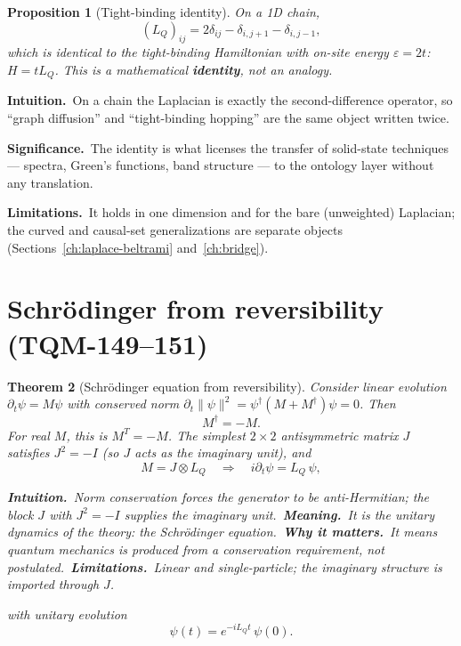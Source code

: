 \documentclass[10pt,twoside,openany]{book}
\newtheorem{theorem}{Theorem}[chapter]
\newtheorem{proposition}[theorem]{Proposition}
\newcommand{\theoremnotes}[3]{%
  \par\medskip\noindent
  \textbf{Intuition.}\ #1\par
  \textbf{Significance.}\ #2\par
  \textbf{Limitations.}\ #3\par}
\newcommand{\eqnotes}[4]{%
  \par\smallskip\noindent
  \textbf{Intuition.}\ #1\ 
  \textbf{Meaning.}\ #2\ 
  \textbf{Why it matters.}\ #3\ 
  \textbf{Limitations.}\ #4\par}
\begin{document}
\begin{proposition}[Tight-binding identity]
On a 1D chain,
\begin{equation}
(L_Q)_{ij} = 2\delta_{ij} - \delta_{i,j+1} - \delta_{i,j-1},
\end{equation}
which is \emph{identical} to the tight-binding Hamiltonian with on-site energy
$\varepsilon=2t$: $H = t L_Q$. This is a mathematical \textbf{identity}, not an analogy.
\end{proposition}

\theoremnotes
{On a chain the Laplacian is exactly the second-difference operator, so ``graph diffusion''
and ``tight-binding hopping'' are the same object written twice.}
{The identity is what licenses the transfer of solid-state techniques --- spectra,
Green's functions, band structure --- to the ontology layer without any translation.}
{It holds in one dimension and for the bare (unweighted) Laplacian; the curved and
causal-set generalizations are separate objects (Sections~\ref{ch:laplace-beltrami}
and~\ref{ch:bridge}).}

\section{Schr\"odinger from reversibility (TQM-149--151)}

\begin{theorem}[Schr\"odinger equation from reversibility]
Consider linear evolution $\partial_t\psi = M\psi$ with conserved norm
$\partial_t\|\psi\|^2 = \psi^\dagger(M+M^\dagger)\psi = 0$. Then
\begin{equation}
M^\dagger = -M .
\end{equation}
For real $M$, this is $M^T=-M$. The simplest $2\times2$ antisymmetric matrix $J$ satisfies
$J^2=-I$ (so $J$ acts as the imaginary unit), and
\begin{equation}
M = J\otimes L_Q \quad\Longrightarrow\quad i\partial_t \psi = L_Q\,\psi,
\end{equation}

\eqnotes
{Norm conservation forces the generator to be anti-Hermitian; the block $J$ with $J^2=-I$
supplies the imaginary unit.}
{It is the unitary dynamics of the theory: the Schr\"odinger equation.}
{It means quantum mechanics is \emph{produced} from a conservation requirement, not
postulated.}
{Linear and single-particle; the imaginary structure is imported through $J$.}
with unitary evolution
\begin{equation}
\psi(t) = e^{-iL_Qt}\,\psi(0).
\end{equation}
\end{theorem}
\end{document}
